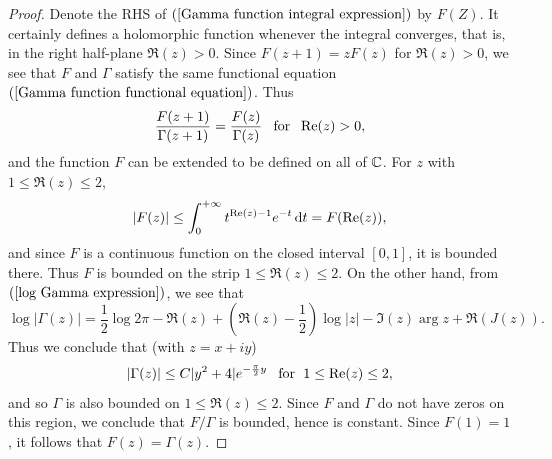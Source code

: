 \begin{proof}
Denote the RHS of $(\ref{Gamma function integral expression})$ by $F(Z)$. It certainly defines a holomorphic function whenever the integral converges, that is, in the right half-plane $\Re(z)>0$. Since $F(z+1)=zF(z)$ for $\Re(z)>0$, we see that $F$ and $\Gamma$ satisfy the same functional equation $(\ref{Gamma function functional equation})$. Thus
\[\frac{F(z+1)}{\Gamma(z+1)}=\frac{F(z)}{\Gamma(z)}\hspace{8pt}\text{for}\hspace{6pt}\operatorname{Re}(z)>0,\]
and the function $F$ can be extended to be defined on all of $\mathbb{C}$. For $z$ with $1\leq\Re(z)\leq 2$,
\[|F(z)|\leq\int_{0}^{+\infty}t^{\operatorname{Re}(z)-1}e^{-t}\mathop{}\!\mathrm{d} t=F(\operatorname{Re}(z)),\]
and since $F$ is a continuous function on the closed interval $[0,1]$, it is bounded there. Thus $F$ is bounded on the strip $1\leq\Re(z)\leq 2$. On the other hand, from $(\ref{log Gamma expression})$, we see that
\[\log|\Gamma(z)|=\frac{1}{2}\log 2\pi-\Re(z)+(\Re(z)-\frac{1}{2})\log|z|-\Im(z)\arg z+\Re(J(z)).\]
Thus we conclude that (with $z=x+iy$)
\[|\Gamma(z)|\leq C|y^2+4|e^{-\frac{\pi}{2}y}\hspace{8pt}\text{for}\hspace{6pt} 1\leq\operatorname{Re}(z)\leq 2,\]
and so $\Gamma$ is also bounded on $1\leq\Re(z)\leq 2$. Since $F$ and $\Gamma$ do not have zeros on this region, we conclude that $F/\Gamma$ is bounded, hence is constant. Since $F(1)=1$, it follows that $F(z)=\Gamma(z)$. 
\end{proof}
